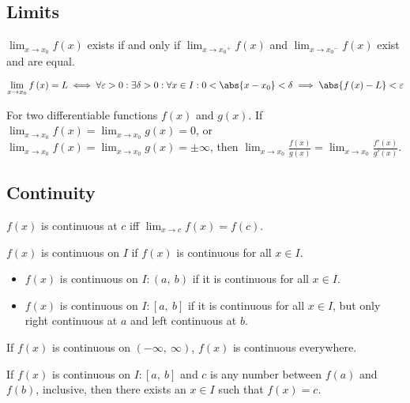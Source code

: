 \documentclass{article}
\begin{document}
\subsection{Limits}
\begin{theorem}[Limits]
    \(\displaystyle\lim_{x\to x_0} f\left( x \right)\) exists if and only if
    \(\displaystyle\lim_{x\to {x_0}^+} f\left( x \right)\) and
    \(\displaystyle\lim_{x\to {x_0}^-} f\left( x \right)\) exist and are equal.
\end{theorem}
\begin{definition}
    \begin{equation*}
        \lim_{x\to x_0} f\left( x \right) = L \iff \forall\varepsilon>0: \exists\delta>0: \forall x \in I: 0<\abs{x-x_0}<\delta \implies \abs{f\left( x \right)-L}<\varepsilon
    \end{equation*}
\end{definition}
\begin{theorem}
    For two differentiable functions \(f\left( x \right)\) and \(g\left( x \right)\).
    If \(\displaystyle \lim_{x\to x_0}f\left( x \right)=\lim_{x\to x_0}g\left( x \right)=0\),
    or \(\displaystyle \lim_{x\to x_0}f\left( x \right)=\displaystyle \lim_{x\to x_0}g\left( x \right)=\pm\infty\),
    then
    \(\lim_{x\to x_0}\frac{f\left( x \right)}{g\left( x \right)} = \lim_{x\to x_0}\frac{f'\left( x \right)}{g'\left( x \right)}\).
\end{theorem}
\subsection{Continuity}
\begin{theorem}
    \(f\left( x \right)\) is continuous at \(c\) iff \(\displaystyle \lim_{x\to c} f\left( x \right) = f\left( c \right)\).
\end{theorem}
\begin{theorem}
    \(f\left( x \right)\) is continuous on \(I\) if \(f\left( x \right)\) is continuous for all
    \(x\in I\).
    \begin{itemize}
        \item \(f\left( x \right)\) is continuous on \(I:\left( a,\:b \right)\) if it
              is continuous for all \(x\in I\).
        \item \(f\left( x \right)\) is continuous on \(I:\left[ a,\:b \right]\) if it
              is continuous for all \(x\in I\), but only right
              continuous at \(a\) and left continuous at \(b\).
    \end{itemize}
    If \(f\left( x \right)\) is continuous on \(\left(-\infty,\:\infty\right)\),
    \(f\left( x \right)\) is continuous everywhere.
\end{theorem}
\begin{theorem}
    If \(f\left( x \right)\) is continuous on \(I:\left[ a, \: b \right]\) and \(c\)
    is any number between \(f\left( a \right)\) and \(f\left( b \right)\), inclusive, then there
    exists an \(x\in I\) such that \(f\left( x \right)=c\).
\end{theorem}
\end{document}
